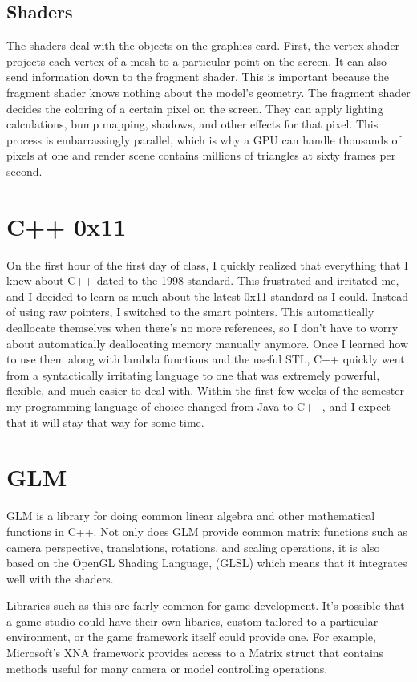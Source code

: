 \documentclass[journal]{IEEEtran}
\begin{document}
\subsection{Shaders}

The shaders deal with the objects on the graphics card. First, the vertex shader projects each vertex of a mesh to a particular point on the screen. It can also send information down to the fragment shader. This is important because the fragment shader knows nothing about the model's geometry. The fragment shader decides the coloring of a certain pixel on the screen. They can apply lighting calculations, bump mapping, shadows, and other effects for that pixel. This process is embarrassingly parallel, which is why a GPU can handle thousands of pixels at one and render scene contains millions of triangles at sixty frames per second.

\section{C++ 0x11}

On the first hour of the first day of class, I quickly realized that everything that I knew about C++ dated to the 1998 standard. This frustrated and irritated me, and I decided to learn as much about the latest 0x11 standard as I could. Instead of using raw pointers, I switched to the smart pointers. This automatically deallocate themselves when there's no more references, so I don't have to worry about automatically deallocating memory manually anymore. Once I learned how to use them along with lambda functions and the useful STL, C++ quickly went from a syntactically irritating language to one that was extremely powerful, flexible, and much easier to deal with. Within the first few weeks of the semester my programming language of choice changed from Java to C++, and I expect that it will stay that way for some time.

\section{GLM}

GLM is a library for doing common linear algebra and other mathematical functions in C++.  Not only does GLM provide common matrix functions such as camera perspective, translations, rotations, and scaling operations, it is also based on the OpenGL Shading Language, (GLSL) which means that it integrates well with the shaders.

Libraries such as this are fairly common for game development. It's possible that a game studio could have their own libaries, custom-tailored to a particular environment, or the game framework itself could provide one. For example, Microsoft's XNA framework provides access to a Matrix struct that contains methods useful for many camera or model controlling operations.
\end{document}
